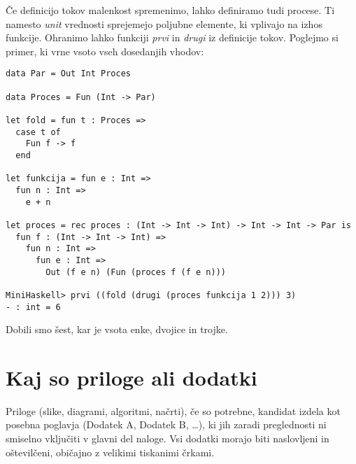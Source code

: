 \documentclass[12pt,a4paper,openany]{book}
\begin{document}
Če definicijo tokov malenkost spremenimo, lahko definiramo tudi procese. Ti namesto \emph{unit} vrednosti sprejemejo poljubne elemente, ki 
vplivajo na izhos funkcije. Ohranimo lahko funkciji \emph{prvi} in \emph{drugi} iz definicije tokov. Poglejmo si primer, ki vrne vsoto 
vseh dosedanjih vhodov:
\begin{lstlisting}
data Par = Out Int Proces

data Proces = Fun (Int -> Par)

let fold = fun t : Proces =>
  case t of
    Fun f -> f
  end

let funkcija = fun e : Int =>
  fun n : Int =>
    e + n

let proces = rec proces : (Int -> Int -> Int) -> Int -> Int -> Par is
  fun f : (Int -> Int -> Int) =>
    fun n : Int =>
      fun e : Int =>
        Out (f e n) (Fun (proces f (f e n)))
  
MiniHaskell> prvi ((fold (drugi (proces funkcija 1 2))) 3)
- : int = 6
\end{lstlisting}
Dobili smo šest, kar je vsota enke, dvojice in trojke.

\newpage


\appendix


\chapter{Kaj so priloge ali dodatki}

Priloge (slike, diagrami, algoritmi, načrti), 
če so potrebne, kandidat izdela kot posebna poglavja (Dodatek A, Dodatek B, \ldots), ki jih zaradi preglednosti ni smiselno vključiti v glavni
del naloge. Vsi dodatki morajo biti naslovljeni in oštevilčeni, običajno z velikimi tiskanimi črkami. 

\newpage

\listoffigures

\newpage

\listoftables




\newpage


\label{stran_literatura}
 
\end{document}
